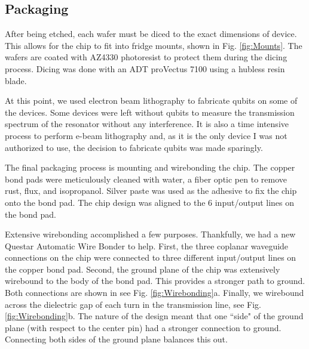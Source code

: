 \documentclass[11 pt, oneside]{book} %
\begin{document}
\subsection{Packaging}
After being etched, each wafer must be diced to the exact dimensions of device. This allows for the chip to fit into fridge mounts, shown in Fig. \ref{fig:Mounts}. The wafers are coated with AZ4330 photoresist to protect them during the dicing process. Dicing was done with an ADT proVectus 7100 using a hubless resin blade. 

At this point, we used electron beam lithography to fabricate qubits on some of the devices. Some devices were left without qubits to measure the transmission spectrum of the resonator without any interference. It is also a time intensive process to perform e-beam lithography and, as it is the only device I was not authorized to use, the decision to fabricate qubits was made sparingly.

The final packaging process is mounting and wirebonding the chip. The copper bond pads were meticulously cleaned with water, a fiber optic pen to remove rust, flux, and isopropanol. Silver paste was used as the adhesive to fix the chip onto the bond pad. The chip design was aligned to the 6 input/output lines on the bond pad.

Extensive wirebonding accomplished a few purposes. Thankfully, we had a new Questar Automatic Wire Bonder to help. First, the three coplanar waveguide connections on the chip were connected to three different input/output lines on the copper bond pad. Second, the ground plane of the chip was extensively wirebound to the body of the bond pad. This provides a stronger path to ground. Both connections are shown in see Fig. \ref{fig:Wirebonding}a. Finally, we wirebound across the dielectric gap of each turn in the transmission line, see Fig. \ref{fig:Wirebonding}b. The nature of the design meant that one ``side" of the ground plane (with respect to the center pin) had a stronger connection to ground. Connecting both sides of the ground plane balances this out. 
\end{document}
